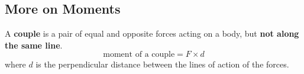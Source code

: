 \subsection{More on Moments}

A \textbf{couple} is a pair of equal and opposite forces acting on a body, but \textbf{not along the same line}.
$$\text{moment of a couple}=F\times d$$
where $d$ is the perpendicular distance between the lines of action of the forces.
